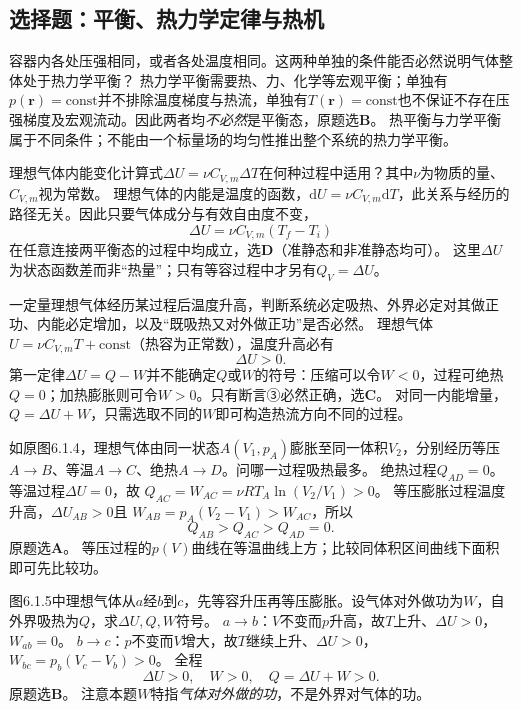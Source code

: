 \subsection{选择题：平衡、热力学定律与热机}

\problemtext 容器内各处压强相同，或者各处温度相同。这两种单独的条件能否必然说明气体整体处于热力学平衡？
\workings
热力学平衡需要热、力、化学等宏观平衡；单独有$p(\bm r)=\mathrm{const}$并不排除温度梯度与热流，单独有$T(\bm r)=\mathrm{const}$也不保证不存在压强梯度及宏观流动。因此两者均\emph{不必然}是平衡态，原题选\textbf{B}。
\crosscheck 热平衡与力学平衡属于不同条件；不能由一个标量场的均匀性推出整个系统的热力学平衡。

\problemtext 理想气体内能变化计算式$\Delta U=\nu C_{V,m}\Delta T$在何种过程中适用？其中$\nu$为物质的量、$C_{V,m}$视为常数。
\workings
理想气体的内能是温度的函数，$\mathrm dU=\nu C_{V,m}\mathrm dT$，此关系与经历的路径无关。因此只要气体成分与有效自由度不变，
\[
\boxed{\Delta U=\nu C_{V,m}(T_f-T_i)}
\]
在任意连接两平衡态的过程中均成立，选\textbf{D}（准静态和非准静态均可）。
\crosscheck 这里$\Delta U$为状态函数差而非“热量”；只有等容过程中才另有$Q_V=\Delta U$。

\problemtext 一定量理想气体经历某过程后温度升高，判断系统必定吸热、外界必定对其做正功、内能必定增加，以及“既吸热又对外做正功”是否必然。
\workings
理想气体$U=\nu C_{V,m}T+\mathrm{const}$（热容为正常数），温度升高必有
\[
\boxed{\Delta U>0}.
\]
第一定律$\Delta U=Q-W$并不能确定$Q$或$W$的符号：压缩可以令$W<0$，过程可绝热$Q=0$；加热膨胀则可令$W>0$。只有断言③必然正确，选\textbf{C}。
\crosscheck 对同一内能增量，$Q=\Delta U+W$，只需选取不同的$W$即可构造热流方向不同的过程。

\problemtext 如原图6.1.4，理想气体由同一状态$A(V_1,p_A)$膨胀至同一体积$V_2$，分别经历等压$A\to B$、等温$A\to C$、绝热$A\to D$。问哪一过程吸热最多。
\workings
绝热过程$Q_{AD}=0$。等温过程$\Delta U=0$，故
$Q_{AC}=W_{AC}=\nu RT_A\ln(V_2/V_1)>0$。
等压膨胀过程温度升高，$\Delta U_{AB}>0$且
$W_{AB}=p_A(V_2-V_1)>W_{AC}$，所以
\[
\boxed{Q_{AB}>Q_{AC}>Q_{AD}=0}.
\]
原题选\textbf{A}。
\crosscheck 等压过程的$p(V)$曲线在等温曲线上方；比较同体积区间曲线下面积即可先比较功。

\problemtext 图6.1.5中理想气体从$a$经$b$到$c$，先等容升压再等压膨胀。设气体对外做功为$W$，自外界吸热为$Q$，求$\Delta U,Q,W$符号。
\workings
$a\to b$：$V$不变而$p$升高，故$T$上升、$\Delta U>0$，$W_{ab}=0$。
$b\to c$：$p$不变而$V$增大，故$T$继续上升、$\Delta U>0$，$W_{bc}=p_b(V_c-V_b)>0$。
全程
\[
\boxed{\Delta U>0,\quad W>0,\quad Q=\Delta U+W>0}.
\]
原题选\textbf{B}。
\crosscheck 注意本题$W$特指\emph{气体对外做的功}，不是外界对气体的功。

